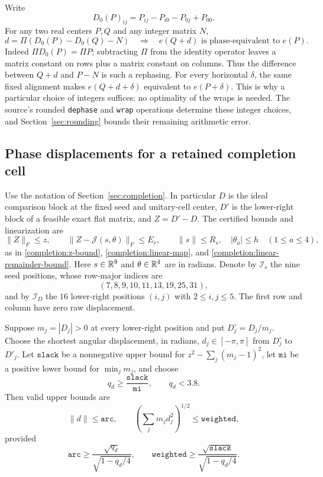 Write
\[
 D_0(P)_{ij}=P_{ij}-P_{i0}-P_{0j}+P_{00}.
\]
For any two real centers \(P,Q\) and any integer matrix \(N\),
\begin{equation}
 d=\Pi(D_0(P)-D_0(Q)-N)
 \quad\Longrightarrow\quad
 e(Q+d)\text{ is phase-equivalent to }e(P).
 \label{phase:alignment}
\end{equation}
Indeed \(\Pi D_0(P)=\Pi P\); subtracting \(\Pi\) from the identity
operator leaves a matrix constant on rows plus a matrix constant on
columns.  Thus the difference between \(Q+d\) and \(P-N\) is such a
rephasing.  For every horizontal \(\delta\), the same fixed
alignment makes \(e(Q+d+\delta)\) equivalent to \(e(P+\delta)\).
This is why a particular choice of integers suffices: no optimality
of the wraps is needed.  The source's rounded \texttt{dephase} and
\texttt{wrap} operations determine these integer choices, and
Section~\ref{sec:rounding} bounds their remaining arithmetic error.

\subsection{Phase displacements for a retained completion cell}

Use the notation of Section~\ref{sec:completion}.  In particular \(D\)
is the ideal comparison block at the fixed seed and unitary-cell
center, \(D'\) is the lower-right block of a feasible exact flat
matrix, and \(Z=D'-D\).  The certified bounds and linearization are
\[
 \|Z\|_F\leq z,\qquad
 \|Z-\mathcal J(s,\theta)\|_F\leq E_r,\qquad
 \|s\|\leq R_s,\quad |\theta_a|\leq h\quad(1\leq a\leq4),
\]
as in \eqref{completion:z-bound},
\eqref{completion:linear-map}, and
\eqref{completion:linear-remainder-bound}.  Here \(s\in\mathbb R^9\) and
\(\theta\in\mathbb R^4\) are in radians.  Denote by \(\mathcal I_s\) the nine
seed positions, whose row-major indices are
\[
 (7,8,9,10,11,13,19,25,31),
\]
and by \(\mathcal I_D\) the \(16\) lower-right positions
\((i,j)\) with \(2\leq i,j\leq5\).  The first row and column have zero
raw displacement.

\begin{lemma}
\label{phase:arc-bounds}
Suppose \(m_j=|D_j|>0\) at every lower-right position and put
\(D_j^\circ=D_j/m_j\).  Choose the shortest angular displacement, in
radians, \(d_j\in[-\pi,\pi]\) from \(D_j^\circ\) to \(D'_j\).  Let
\(\mathtt{slack}\) be a nonnegative upper bound for
\(z^2-\sum_j(m_j-1)^2\), let \(\mathtt{mi}\) be a positive lower bound
for \(\min_jm_j\), and choose
\[
 q_d\geq\frac{\mathtt{slack}}{\mathtt{mi}},\qquad q_d<3.8.
\]
Then valid upper bounds are
\begin{equation}
 \|d\|\leq\mathtt{arc},\qquad
 \left(\sum_jm_jd_j^2\right)^{1/2}\leq\mathtt{weighted},
 \label{phase:arc-weighted}
\end{equation}
provided
\[
 \mathtt{arc}\geq\frac{\sqrt{q_d}}{\sqrt{1-q_d/4}},\qquad
 \mathtt{weighted}\geq
             \frac{\sqrt{\mathtt{slack}}}{\sqrt{1-q_d/4}}.
\]
\end{lemma}

